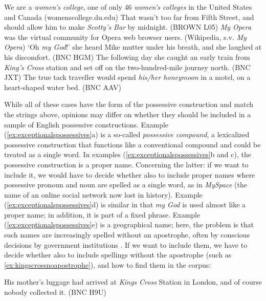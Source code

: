 \begin{exe}
\ex
\begin{xlist}
\label{ex:exceptionalspossessives}
\ex We are a \textit{women's college}, one of only 46 \textit{women's colleges} in the United States and Canada (womenscollege.du.edu)
\ex That wasn't too far from Fifth Street, and should allow him to make \textit{Scotty's Bar} by midnight. (BROWN L05)
\ex \textit{My Opera} was the virtual community for Opera web browser users. (Wikipedia, s.v. \textit{My Opera})
\ex `Oh \textit{my God}!' she heard Mike mutter under his breath, and she laughed at his discomfort. (BNC HGM)
\ex The following day she caught an early train from \textit{King's Cross} station and set off on the two\hyp{}hundred\hyp{}mile journey north. (BNC JXT)
\ex The true tack traveller would spend \textit{his\slash her honeymoon} in a motel, on a heart\hyp{}shaped water bed. (BNC AAV)
\end{xlist}
\end{exe}

While all of these cases have the form of the possessive  construction and match the strings above, opinions may differ on whether they should be included in a sample of English possessive constructions. Example (\ref{ex:exceptionalspossessives}a) is a so\hyp{}called \textit{possessive compound},  a lexicalized  possessive construction that functions like a conventional  compound and could be treated as a single word. In examples (\ref{ex:exceptionalspossessives}b and c), the possessive construction is a proper name. Concerning the latter: if we want to include it, we would have to decide whether also to include proper names where possessive  pronoun  and noun  are spelled as a single word, as in \emph{MySpace} (the name of an online social network now lost in history). Example (\ref{ex:exceptionalspossessives}d) is similar in that \textit{my God} is used almost like a proper name; in addition, it is part of a fixed phrase. Example (\ref{ex:exceptionalspossessives}e) is a geographical name; here, the problem is that such names are increasingly spelled without an apostrophe, often by conscious decisions by government institutions \citep[see][]{swaine_apostrophes_2009,newman_u.s._2013}. If we want to include them, we have to decide whether also to include spellings without the apostrophe (such as \ref{ex:kingscrossnoapostrophe}), and how to find them in the corpus:

\begin{exe}
\ex His mother's luggage had arrived at \textit{Kings Cross} Station in London, and of course nobody collected it. (BNC H9U)
\label{ex:kingscrossnoapostrophe}
\end{exe}

